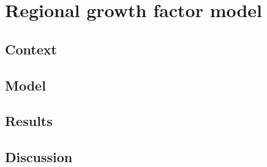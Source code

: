 \section{Regional growth factor model}%
\label{sec:regional_growth_factor_model}

\subsection{Context}


\subsection{Model}

\subsection{Results}

\subsection{Discussion}

